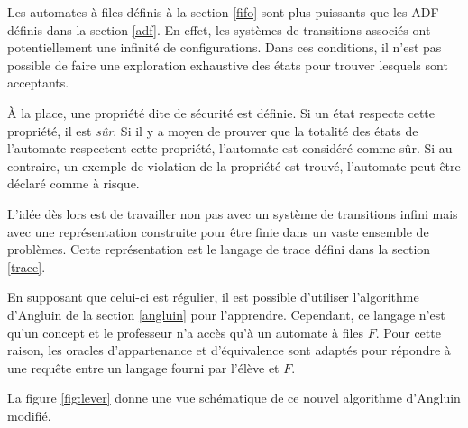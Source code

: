 Les automates à files définis à la section \ref{fifo} sont plus puissants que les ADF définis dans la section \ref{adf}. En effet, les systèmes de transitions associés ont potentiellement une infinité de configurations. Dans ces conditions, il n'est pas possible de faire une exploration exhaustive des états pour trouver lesquels sont acceptants.

À la place, une propriété dite de sécurité est définie. Si un état respecte cette propriété, il est \emph{sûr}. Si il y a moyen de prouver que la totalité des états de l'automate respectent cette propriété, l'automate est considéré comme sûr. Si au contraire, un exemple de violation de la propriété est trouvé, l'automate peut être déclaré comme à risque.

L'idée dès lors est de travailler non pas avec un système de transitions infini mais avec une représentation construite pour être finie dans un vaste ensemble de problèmes. Cette représentation est le langage de trace défini dans la section \ref{trace}.

En supposant que celui-ci est régulier, il est possible d'utiliser l'algorithme d'Angluin de la section \ref{angluin} pour l'apprendre. Cependant, ce langage n'est qu'un concept et le professeur n'a accès qu'à un automate à files $F$. Pour cette raison, les oracles d'appartenance et d'équivalence sont adaptés pour répondre à une requête entre un langage fourni par l'élève et $F$.

La figure \ref{fig:lever} donne une vue schématique de ce nouvel algorithme d'Angluin modifié.


